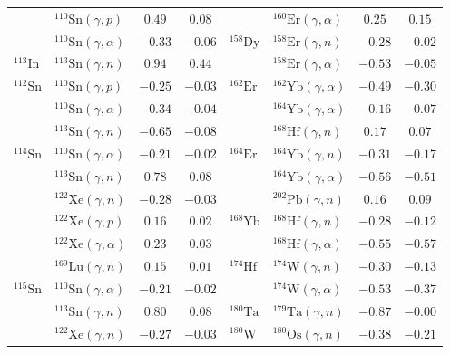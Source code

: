 \begin{table}
\begin{tabular}{llcc|llcc}
    $ $ & $^{110}\mathrm{Sn}(\gamma,p)$ & $0.49$ & $0.08$ & $ $ & $^{160}\mathrm{Er}(\gamma,\alpha)$ & $0.25$ & $0.15$ \\ 
    $ $ & $^{110}\mathrm{Sn}(\gamma,\alpha)$ & $-0.33$ & $-0.06$ & $^{158}\mathrm{Dy}$ & $^{158}\mathrm{Er}(\gamma,n)$ & $-0.28$ & $-0.02$ \\ 
    $^{113}\mathrm{In}$ & $^{113}\mathrm{Sn}(\gamma,n)$ & $0.94$ & $0.44$ & $ $ & $^{158}\mathrm{Er}(\gamma,\alpha)$ & $-0.53$ & $-0.05$ \\ 
    $^{112}\mathrm{Sn}$ & $^{110}\mathrm{Sn}(\gamma,p)$ & $-0.25$ & $-0.03$ & $^{162}\mathrm{Er}$ & $^{162}\mathrm{Yb}(\gamma,\alpha)$ & $-0.49$ & $-0.30$ \\ 
    $ $ & $^{110}\mathrm{Sn}(\gamma,\alpha)$ & $-0.34$ & $-0.04$ & $ $ & $^{164}\mathrm{Yb}(\gamma,\alpha)$ & $-0.16$ & $-0.07$ \\ 
    $ $ & $^{113}\mathrm{Sn}(\gamma,n)$ & $-0.65$ & $-0.08$ & $ $ & $^{168}\mathrm{Hf}(\gamma,n)$ & $0.17$ & $0.07$ \\ 
    $^{114}\mathrm{Sn}$ & $^{110}\mathrm{Sn}(\gamma,\alpha)$ & $-0.21$ & $-0.02$ & $^{164}\mathrm{Er}$ & $^{164}\mathrm{Yb}(\gamma,n)$ & $-0.31$ & $-0.17$ \\ 
    $ $ & $^{113}\mathrm{Sn}(\gamma,n)$ & $0.78$ & $0.08$ & $ $ & $^{164}\mathrm{Yb}(\gamma,\alpha)$ & $-0.56$ & $-0.51$ \\ 
    $ $ & $^{122}\mathrm{Xe}(\gamma,n)$ & $-0.28$ & $-0.03$ & $ $ & $^{202}\mathrm{Pb}(\gamma,n)$ & $0.16$ & $0.09$ \\ 
    $ $ & $^{122}\mathrm{Xe}(\gamma,p)$ & $0.16$ & $0.02$ & $^{168}\mathrm{Yb}$ & $^{168}\mathrm{Hf}(\gamma,n)$ & $-0.28$ & $-0.12$ \\ 
    $ $ & $^{122}\mathrm{Xe}(\gamma,\alpha)$ & $0.23$ & $0.03$ & $ $ & $^{168}\mathrm{Hf}(\gamma,\alpha)$ & $-0.55$ & $-0.57$ \\ 
    $ $ & $^{169}\mathrm{Lu}(\gamma,n)$ & $0.15$ & $0.01$ & $^{174}\mathrm{Hf}$ & $^{174}\mathrm{W}(\gamma,n)$ & $-0.30$ & $-0.13$ \\ 
    $^{115}\mathrm{Sn}$ & $^{110}\mathrm{Sn}(\gamma,\alpha)$ & $-0.21$ & $-0.02$ & $ $ & $^{174}\mathrm{W}(\gamma,\alpha)$ & $-0.53$ & $-0.37$ \\ 
    $ $ & $^{113}\mathrm{Sn}(\gamma,n)$ & $0.80$ & $0.08$ & $^{180}\mathrm{Ta}$ & $^{179}\mathrm{Ta}(\gamma,n)$ & $-0.87$ & $-0.00$ \\ 
    $ $ & $^{122}\mathrm{Xe}(\gamma,n)$ & $-0.27$ & $-0.03$ & $^{180}\mathrm{W}$ & $^{180}\mathrm{Os}(\gamma,n)$ & $-0.38$ & $-0.21$ \\ 

\end{tabular}
\end{table}
